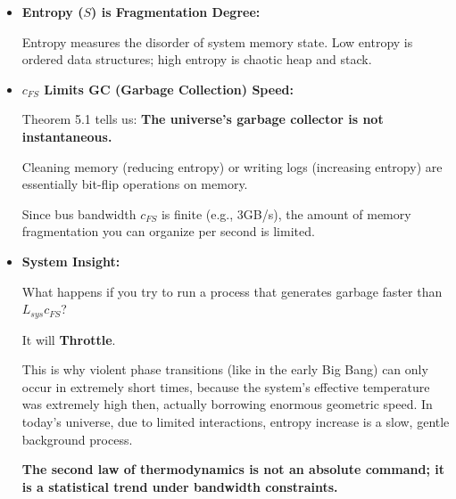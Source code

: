\begin{itemize}
\item \textbf{Entropy ($S$) is Fragmentation Degree:}

    Entropy measures the disorder of system memory state. Low entropy is ordered data structures; high entropy is chaotic heap and stack.

\item \textbf{$c_{FS}$ Limits GC (Garbage Collection) Speed:}

    Theorem 5.1 tells us: \textbf{The universe's garbage collector is not instantaneous.}

    Cleaning memory (reducing entropy) or writing logs (increasing entropy) are essentially bit-flip operations on memory.

    Since bus bandwidth \textbf{$c_{FS}$} is finite (e.g., 3GB/s), the amount of memory fragmentation you can organize per second is limited.

\item \textbf{System Insight:}

    What happens if you try to run a process that generates garbage faster than \textbf{$L_{sys} c_{FS}$}?

    It will \textbf{Throttle}.

    This is why violent phase transitions (like in the early Big Bang) can only occur in extremely short times, because the system's effective temperature was extremely high then, actually borrowing enormous geometric speed. In today's universe, due to limited interactions, entropy increase is a slow, gentle background process.

    \textbf{The second law of thermodynamics is not an absolute command; it is a statistical trend under bandwidth constraints.}
\end{itemize}

